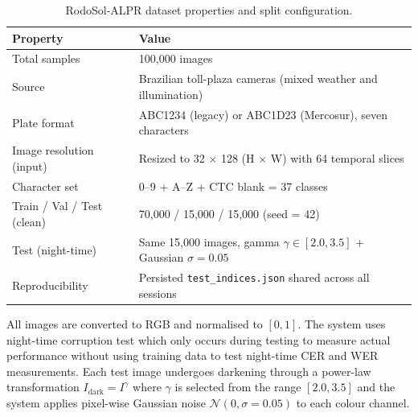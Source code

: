 \documentclass{ieeeaccess}
\begin{document}
\begin{table}[h]
\centering
\caption{RodoSol-ALPR dataset properties and split configuration.}
\label{tab:dataset}
\begin{tabularx}{\columnwidth}{@{}lX@{}}
\toprule
\textbf{Property} & \textbf{Value} \\
\midrule
Total samples & 100,000 images \\
Source & Brazilian toll-plaza cameras (mixed weather and illumination) \\
Plate format & ABC1234 (legacy) or ABC1D23 (Mercosur), seven characters \\
Image resolution (input) & Resized to 32 $\times$ 128 (H $\times$ W) with 64 temporal slices \\
Character set & 0--9 + A--Z + CTC blank = 37 classes \\
Train / Val / Test (clean) & 70,000 / 15,000 / 15,000 (seed = 42) \\
Test (night-time) & Same 15,000 images, gamma $\gamma \in [2.0, 3.5]$ + Gaussian $\sigma = 0.05$ \\
Reproducibility & Persisted \texttt{test\_indices.json} shared across all sessions \\
\bottomrule
\end{tabularx}
\end{table}

All images are converted to RGB and normalised to $[0, 1]$. The system uses night-time corruption test which only occurs during testing to measure actual performance without using training data to test night-time CER and WER measurements. Each test image undergoes darkening through a power-law transformation $I_{\text{dark}} = I^\gamma$ where $\gamma$ is selected from the range $[2.0, 3.5]$ and the system applies pixel-wise Gaussian noise $\mathcal{N}(0, \sigma = 0.05)$ to each colour channel.
\end{document}
